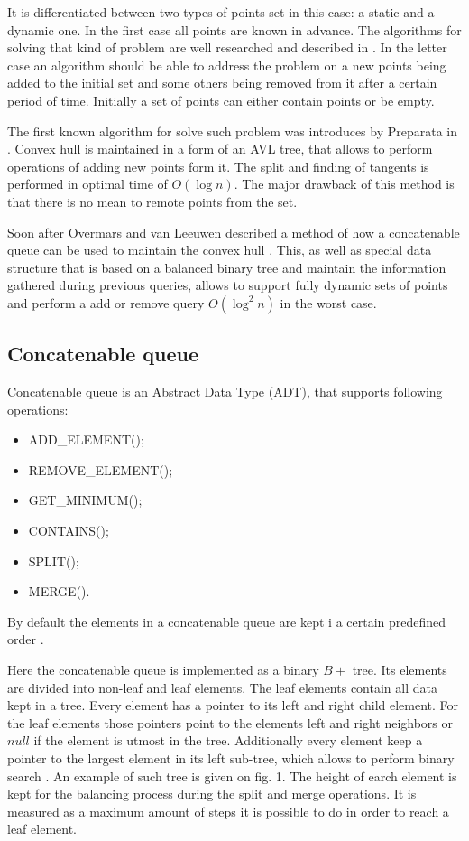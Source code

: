 \documentclass[conference]{IEEEtran}
\theoremstyle{plane}
\begin{document}
It is differentiated between two types of points set in this case: a static and a dynamic one. In the first case all points are known in advance. The algorithms for solving that kind of problem are well researched and described in \cite{jarvis, graham, quickhull}. In the letter case an algorithm should be able to address the problem on a new points being added to the initial set and some others being removed from it after a certain period of time. Initially a set of points can either contain points or be empty. 

The first known algorithm for solve such problem was introduces by Preparata in \cite{preparata}. Convex hull is maintained in a form of an AVL tree, that allows to perform operations of adding new points form it. The split and finding of tangents is performed in optimal time of $O(\log n)$. The major drawback of this method is that there is no mean to remote points from the set. 

Soon after Overmars and van Leeuwen described a method of how a concatenable queue can be used to maintain the convex hull \cite{overmars}. This, as well as special data structure that is based on a balanced binary tree and maintain the information gathered during previous queries, allows to support fully dynamic sets of points and perform a add or remove query  $O(\log^2 n)$ in the worst case.


\subsection{Concatenable queue}


Concatenable queue is an Abstract Data Type (ADT), that supports following operations:

\begin{itemize}
	\item
	ADD\_ELEMENT();
	\item
	REMOVE\_ELEMENT();
	\item
	GET\_MINIMUM();
	\item
	CONTAINS();
	\item
	SPLIT();
	\item
	MERGE().
\end{itemize}

By default the elements in a concatenable queue are kept i a certain predefined order \cite{aho}.

Here the concatenable queue is implemented as a binary  $B+$ tree. Its elements are divided into non-leaf and leaf elements. The leaf elements contain all data kept in a tree. Every element has a pointer to its left and right child element. For the leaf elements those pointers point to the elements left and right neighbors or $null$ if the element is utmost in the tree. 
Additionally every element keep a pointer to the largest element in its left sub-tree, which  allows to perform binary search \cite{aho}.  An example of such tree is given on fig. 1. The height of earch element is kept for the balancing process during the split and merge operations. It is measured as a maximum amount of steps it is possible to do in order to reach a leaf element.
\end{document}

